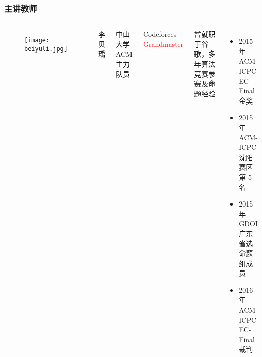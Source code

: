 \begin{frame}[fragile]
    \frametitle{主讲教师}

    \begin{columns}
        \begin{figure}
            \texttt{[image: beiyuli.jpg]}
        \end{figure}

        李贝瑀

        \vspace{.5em}

        {\footnotesize 中山大学 ACM 主力队员}

        \vspace{.5em}

        {\footnotesize Codeforces \textcolor{red}{Grandmaster}}

        \vspace{.5em}

        {\footnotesize 曾就职于谷歌，多年算法竞赛参赛及命题经验}

        \vspace{.5em}

        \begin{itemize}
            \item {\footnotesize 2015 年 ACM-ICPC EC-Final 金奖}
            \item {\footnotesize 2015 年 ACM-ICPC 沈阳赛区第 5 名}
            \item {\footnotesize 2015 年 GDOI 广东省选命题组成员}
            \item {\footnotesize 2016 年 ACM-ICPC EC-Final 裁判}
        \end{itemize}
    \end{columns}
\end{frame}
